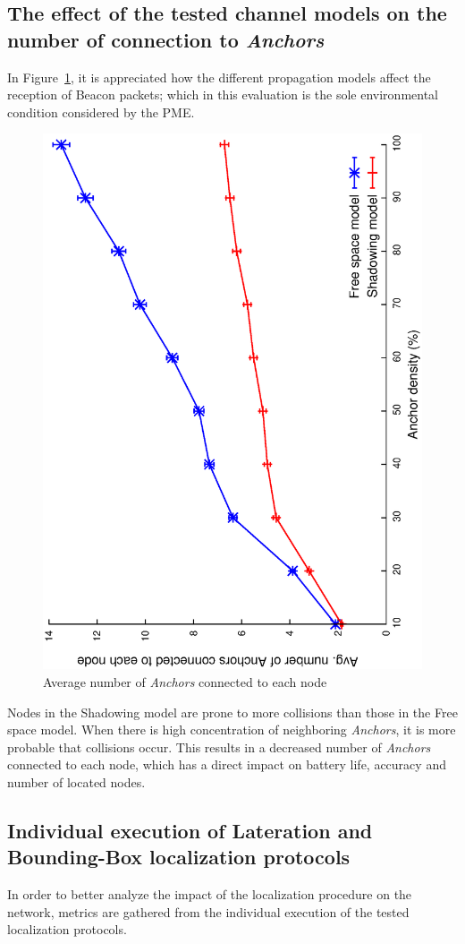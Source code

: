 \subsection{The effect of the tested channel models on the number of connection to \emph{Anchors}}\label{channel_considerations}
In Figure~\ref{fig:channelAndBeacons}, it is appreciated how the different propagation models affect the reception of Beacon packets; which in this evaluation is the sole environmental condition considered by the PME.

\begin{figure}[tb]
  \centering
  \includegraphics[width=0.7\linewidth, angle = -90]{section4/figures/avgBeaconPerNode.eps}
  \caption{Average number of \emph{Anchors} connected to each node}
  \label{fig:channelAndBeacons}
\end{figure}

Nodes in the Shadowing model are prone to more collisions than those in the Free space model. When there is high concentration of neighboring \emph{Anchors}, it is more probable that collisions occur. This results in a decreased number of \emph{Anchors} connected to each node, which has a direct impact on battery life, accuracy and number of located nodes.

\subsection{Individual execution of Lateration and Bounding-Box localization protocols}\label{individual_execution}
In order to better analyze the impact of the localization procedure on the network, metrics are gathered from the individual execution of the tested localization protocols.

